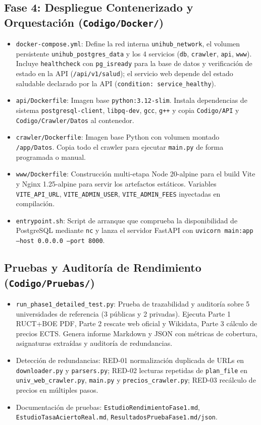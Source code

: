 \subsection{Fase 4: Despliegue Contenerizado y Orquestación (\texttt{Codigo/Docker/})}
\begin{itemize}
    \item \texttt{docker-compose.yml}: Define la red interna \texttt{unihub\_network}, el volumen persistente \texttt{unihub\_postgres\_data} y los 4 servicios (\texttt{db}, \texttt{crawler}, \texttt{api}, \texttt{www}). Incluye \texttt{healthcheck} con \texttt{pg\_isready} para la base de datos y verificación de estado en la API (\texttt{/api/v1/salud}); el servicio web depende del estado saludable declarado por la API (\texttt{condition: service\_healthy}).
    \item \texttt{api/Dockerfile}: Imagen base \texttt{python:3.12-slim}. Instala dependencias de sistema \texttt{postgresql-client}, \texttt{libpq-dev}, \texttt{gcc}, \texttt{g++} y copia \texttt{Codigo/API} y \texttt{Codigo/Crawler/Datos} al contenedor.
    \item \texttt{crawler/Dockerfile}: Imagen base Python con volumen montado \texttt{/app/Datos}. Copia todo el crawler para ejecutar \texttt{main.py} de forma programada o manual.
    \item \texttt{www/Dockerfile}: Construcción multi-etapa Node 20-alpine para el build Vite y Nginx 1.25-alpine para servir los artefactos estáticos. Variables \texttt{VITE\_API\_URL}, \texttt{VITE\_ADMIN\_USER}, \texttt{VITE\_ADMIN\_FEES} inyectadas en compilación.
    \item \texttt{entrypoint.sh}: Script de arranque que comprueba la disponibilidad de PostgreSQL mediante \texttt{nc} y lanza el servidor FastAPI con \texttt{uvicorn main:app --host 0.0.0.0 --port 8000}.
\end{itemize}

\subsection{Pruebas y Auditoría de Rendimiento (\texttt{Codigo/Pruebas/})}
\begin{itemize}
    \item \texttt{run\_phase1\_detailed\_test.py}: Prueba de trazabilidad y auditoría sobre 5 universidades de referencia (3 públicas y 2 privadas). Ejecuta Parte 1 RUCT+BOE PDF, Parte 2 rescate web oficial y Wikidata, Parte 3 cálculo de precios ECTS. Genera informe Markdown y JSON con métricas de cobertura, asignaturas extraídas y auditoría de redundancias.
    \item Detección de redundancias: RED-01 normalización duplicada de URLs en \texttt{downloader.py} y \texttt{parsers.py}; RED-02 lecturas repetidas de \texttt{plan\_file} en \texttt{univ\_web\_crawler.py}, \texttt{main.py} y \texttt{precios\_crawler.py}; RED-03 recálculo de precios en múltiples pasos.
    \item Documentación de pruebas: \texttt{EstudioRendimientoFase1.md}, \texttt{EstudioTasaAciertoReal.md}, \texttt{ResultadosPruebaFase1.md/json}.
\end{itemize}

